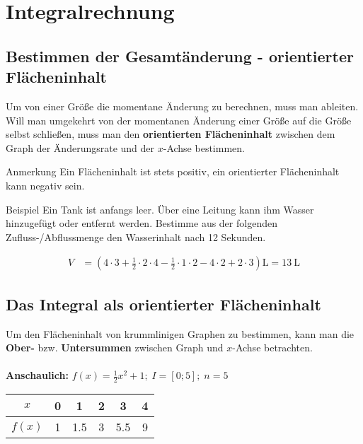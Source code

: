 \documentclass{article}
\begin{document}
\newpage

\section{Integralrechnung}
\subsection{Bestimmen der Gesamtänderung - orientierter Flächeninhalt}

Um von einer Größe die momentane Änderung zu berechnen, muss man ableiten.
Will man umgekehrt von der momentanen Änderung einer Größe auf die Größe selbst schließen, 
muss man den \textbf{orientierten Flächeninhalt} zwischen dem Graph der Änderungsrate und der $x$-Achse bestimmen.
\\
\begin{boxx}[LightYellow]{Anmerkung}
    Ein Flächeninhalt ist stets positiv, ein orientierter Flächeninhalt kann negativ sein.
\end{boxx}

\begin{boxx}[DarkBlue]{Beispiel}
    Ein Tank ist anfangs leer. 
    Über eine Leitung kann ihm Wasser hinzugefügt oder entfernt werden.
    Bestimme aus der folgenden Zufluss-/Abflussmenge den Wasserinhalt nach 12 Sekunden.

    \begin{align*}
        V &= \left(4\cdot3+\frac{1}{2}\cdot2\cdot 4-\frac{1}{2}\cdot 1 \cdot 2 - 4 \cdot 2 + 2\cdot 3\right) \unit{\liter} = \qty{13}{\liter}
    \end{align*}
\end{boxx}

\subsection{Das Integral als orientierter Flächeninhalt}
Um den Flächeninhalt von krummlinigen Graphen zu bestimmen, 
kann man die \textbf{Ober-} bzw. \textbf{Untersummen} zwischen Graph und $x$-Achse betrachten.
\\\\
\textbf{Anschaulich:} $\displaystyle f(x) = \frac{1}{2} x^2 +1;\; I=[0;5];\; n=5$
\begin{table}[H]
    \begin{tabular}{c|ccccc}
        $\displaystyle x$ & 0 & 1 & 2 & 3 & 4 \\ \hline
        $\displaystyle f(x)$ & 1 & 1.5 & 3 & 5.5 & 9 \\
    \end{tabular}
\end{table}
\end{document}
